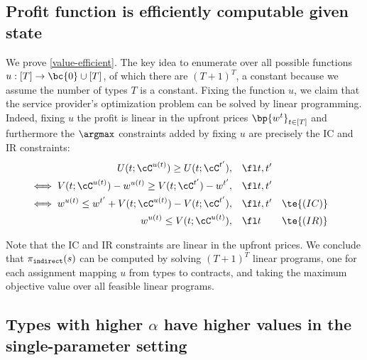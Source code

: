 
\subsection{Profit function is efficiently computable given state} \label{value-is-efficient}

    We prove \cref{value-efficient}. The key idea to enumerate over all possible functions $u:[T]\to \bc{0}\cup [T]$, of which there are $(T+1)^T$, a constant because we assume the number of types $T$ is a constant. Fixing the function $u$, we claim that the service provider's optimization problem can be solved by linear programming. Indeed, fixing $u$ the profit is linear in the upfront prices $\bp{w^t}_{t\in [T]}$ and furthermore the $\argmax$ constraints added by fixing $u$ are precisely the IC and IR constraints:
        \begin{align*}
    U(t; \cC^{u(t)}) \ge U(t; \cC^{t'}), \quad& \fl t,t' \\
        \iff V(t; \cC^{u(t)}) - w^{u(t)} \ge V(t; \cC^{t'}) - w^{t'}, \quad& \fl t,t'\\
        \iff w^{u(t)} \le w^{t'} + V(t; \cC^{u(t)}) - V(t; \cC^{t'}), \quad& \fl t,t' && \te{(IC)} \\
        w^{u(t)} \le V(t;\cC^{u(t)}),\quad& \fl t  && \te{(IR)}
\end{align*}
    
Note that the IC and IR constraints are linear in the upfront prices. We conclude that $\pi_{\tt{indirect}}(s)$ can be computed by solving $(T+1)^T$ linear programs, one for each assignment mapping $u$ from types to contracts, and taking the maximum objective value over all feasible linear programs.

\subsection{Types with higher $\alpha$ have higher values in the single-parameter setting} \label{higher-types-higher-values-proof}

